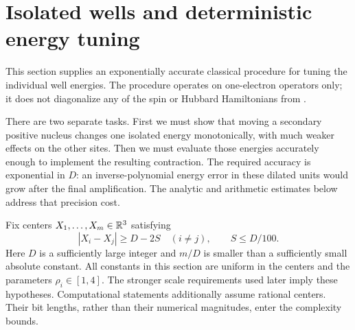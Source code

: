 \section{Isolated wells and deterministic energy tuning}
\label{sec:wells}

This section supplies an exponentially accurate classical procedure for
tuning the individual well energies. The procedure operates on
one-electron operators only; it does not diagonalize any of the spin or
Hubbard Hamiltonians from .

There are two separate tasks. First we must show that moving a secondary
positive nucleus changes one isolated energy monotonically, with much
weaker effects on the other sites. Then we must evaluate those energies
accurately enough to implement the resulting contraction. The required
accuracy is exponential in $D$: an inverse-polynomial energy error in
these dilated units would grow after the final amplification. The
analytic and arithmetic estimates below address that precision cost.

Fix centers \(X_1,\ldots,X_m\in\mathbb R^3\) satisfying
\begin{equation}
 |X_i-X_j|\ge D-2S\quad(i\ne j),\qquad S\le D/100.
 \label{eq:wells-separation}
\end{equation}
Here \(D\) is a sufficiently large integer and \(m/D\) is smaller than a
sufficiently small absolute constant. All constants in this section are
uniform in the centers and the parameters \(\rho_i\in[1,4]\).
The stronger scale requirements used later imply these hypotheses.
Computational statements additionally assume rational centers. Their
bit lengths, rather than their numerical magnitudes, enter the
complexity bounds.

